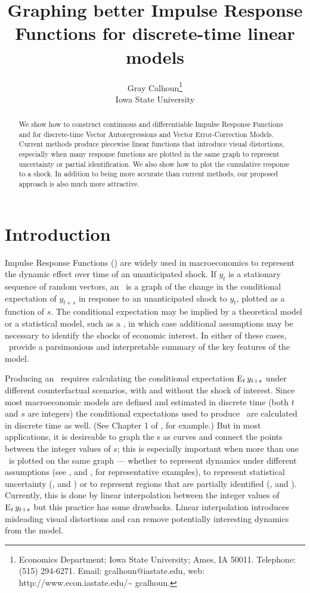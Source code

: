 \documentclass[12pt,fleqn]{article}
\title{Graphing better Impulse Response Functions for discrete-time
  linear models}
\author{Gray Calhoun\thanks{Economics Department; Iowa State
    University; Ames, IA 50011. Telephone: (515) 294-6271.  Email:
    \guillemotleft gcalhoun@iastate.edu\guillemotright, web:
    \guillemotleft http://www.econ.iastate.edu/\textasciitilde
    gcalhoun\guillemotright.} \\
  Iowa State University}
\begin{document}
\maketitle
\begin{abstract}\noindent%
  We show how to construct continuous and differentiable
  Impulse Response Functions and for discrete-time Vector Autoregressions
  and Vector Error-Correction Models. Current methods produce piecewise linear
  functions that introduce visual distortions, especially when many
  response functions are plotted in the same graph to represent
  uncertainty or partial identification. We also show how to plot the
  cumulative response to a shock. In addition to being more accurate
  than current methods, our proposed approach is also much more attractive.
\end{abstract}

\tableofcontents
\newpage

\section{Introduction}
\label{S1}

Impulse Response Functions (\IRFs) are widely used in macroeconomics
to represent the dynamic effect over time of an unanticipated
shock. If $y_t$ is a stationary sequence of random vectors, an \IRF\
is a graph of the change in the conditional expectation of $y_{t+s}$
in response to an unanticipated shock to $y_t$, plotted as a function
of $s$. The conditional expectation may be implied by a theoretical
model or a statistical model, such as a \VAR, in which case additional
assumptions may be necessary to identify the shocks of economic
interest. In either of these cases, \IRFs\ provide a parsimonious and
interpretable summary of the key features of the model.

Producing an \IRF\ requires calculating the conditional expectation
$\operatorname{E}_t y_{t+s}$ under different counterfactual scenarios, with and
without the shock of interest. Since most macroeconomic models are
defined and estimated in discrete time (both $t$ and $s$ are integers)
the conditional expectations used to produce \IRFs\ are calculated in
discrete time as well. (See Chapter 1 of \citealp{Ham:94}, for
example.) But in most applications, it is desireable to graph the \IRF
s as curves and connect the points between the integer values of $s$;
this is especially important when more than one \IRF\ is plotted on
the same graph --- whether to represent dynamics under different
assumptions (see \citealp{BeM:98}, and \citealp{StW:01}, for
representative examples), to represent statistical uncertainty
(\citealp{Kil:98}, and \citealp{SiZ:99}) or to represent regions that
are partially identified (\citealp{Uhl:05}, and
\citealp{InK:13}). Currently, this is done by linear interpolation
between the integer values of $\operatorname{E}_t y_{t+s}$ but this practice has
some drawbacks. Linear interpolation introduces misleading visual
distortions and can remove potentially interesting dynamics from the
model.
\end{document}
